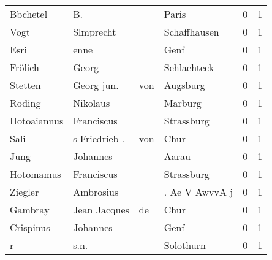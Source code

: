 \begin{tabular}{llllrr}
                 Bbchetel &                                 B. &             &                                       Paris &          0 &         1 \\
                     Vogt &                          Slmprecht &             &                                Schaffhausen &          0 &         1 \\
                     Esri &                               enne &             &                                        Genf &          0 &         1 \\
                  Frölich &                              Georg &             &                                 Sehlaehteck &          0 &         1 \\
                  Stetten &                        Georg  jun. &         von &                                    Augsburg &          0 &         1 \\
                   Roding &                           Nikolaus &             &                                     Marburg &          0 &         1 \\
              Hotoaiannus &                         Franciscus &             &                                  Strassburg &          0 &         1 \\
                     Sali &                      s Friedrieb . &         von &                                        Chur &          0 &         1 \\
                     Jung &                           Johannes &             &                                       Aarau &          0 &         1 \\
                Hotomamus &                         Franciscus &             &                                  Strassburg &          0 &         1 \\
                  Ziegler &                          Ambrosius &             &                              . Ae V AwvvA j &          0 &         1 \\
                  Gambray &                       Jean Jacques &          de &                                        Chur &          0 &         1 \\
                Crispinus &                           Johannes &             &                                        Genf &          0 &         1 \\
                        r &                               s.n. &             &                                   Solothurn &          0 &         1 \\

\end{tabular}
